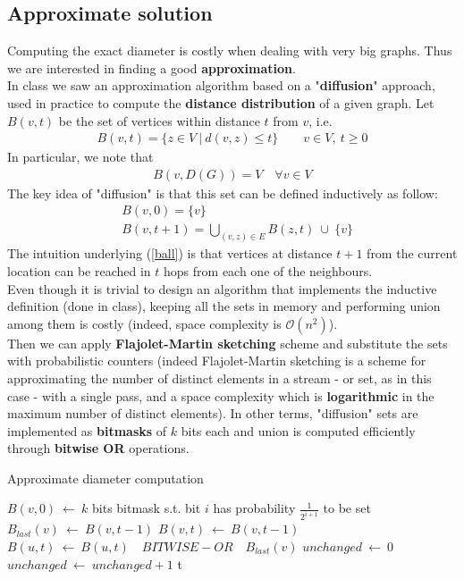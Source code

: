 \subsection{Approximate solution}

Computing the exact diameter is costly when dealing with very big graphs. Thus we are interested in finding a good \textbf{approximation}.\\
In class we saw an approximation algorithm based on a "\textbf{diffusion}" approach, used in practice to compute the \textbf{distance distribution} of a given graph. Let $B(v,t)$ be the set of vertices within distance $t$ from $v$, i.e.
\begin{align*}
B(v,t) = \{ z \in V \ | \ d(v,z) \le t \} \qquad v \in V, \ t \ge 0
\end{align*}
In particular, we note that
\begin{align}
B(v,D(G)) = V \quad \forall v \in V \label{ball_diameter}
\end{align}
The key idea of "diffusion" is that this set can be defined inductively as follow:
\begin{align}
&B(v,0) = \{ v \} \nonumber\\
&B(v,t+1) = \bigcup_{(v,z) \in E} B(z,t) \ \cup \ \{ v \} \label{ball}
\end{align}
The intuition underlying (\ref{ball}) is that vertices at distance $t+1$ from the current location can be reached in $t$ hops from each one of the neighbours. \\
Even though it is trivial to design an algorithm that implements the inductive definition (done in class), keeping all the sets in memory and performing union among them is costly (indeed, space complexity is $\mathcal{O}(n^2)$).\\
Then we can apply \textbf{Flajolet-Martin sketching}\cite{fm} scheme and substitute the sets with probabilistic counters (indeed Flajolet-Martin sketching is a scheme for approximating the number of distinct elements in a stream - or set, as in this case - with a single pass, and a space complexity which is \textbf{logarithmic} in the maximum number of distinct elements). In other terms, "diffusion" sets are implemented as \textbf{bitmasks} of $k$ bits each and union is computed efficiently through \textbf{bitwise OR} operations.
\medskip
\setcounter{algorithm}{0}
\begin{algorithm}
\caption{Approximate diameter computation}
\begin{algorithmic}[1]
		\State $B(v,0) \ \leftarrow \ k$ bits bitmask s.t. bit $i$ has probability $\frac{1}{2^{i+1}}$ to be set
	\EndFor
			\State $B_{last}(v) \ \leftarrow \ B(v,t-1)$
            \State $B(v,t) \ \leftarrow \ B(v,t-1)$
		\EndFor
			\State $B(u,t) \ \leftarrow \ B(u,t) \quad BITWISE-OR \quad B_{last}(v)$
		\EndFor
		\State $unchanged \ \leftarrow \ 0$
				\State $unchanged \ \leftarrow \ unchanged + 1$
			\EndIf
		\EndFor
			\State \Return t 
		\EndIf
	\EndFor
\end{algorithmic}
\end{algorithm}

